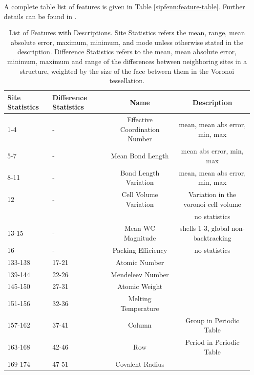 A complete table list of features is given in Table \ref{sipfenn:feature-table}. Further details can be found in \cite{Ward2016AMaterials, Ward2017IncludingTessellations}.

\begin{table}[H]
    \footnotesize
    \centering
    \caption{List of Features with Descriptions. Site Statistics refers the mean, range, mean absolute error, maximum, minimum, and mode unless otherwise stated in the description. Difference Statistics refers to the mean, mean absolute error, minimum, maximum and range of the differences between neighboring sites in a structure, weighted by the size of the face between them in the Voronoi tessellation.}
    \begin{tabular}{|p{2.25cm}|p{2cm}|c|c|}
        \hline
        \textbf{Site \hspace{0.3cm} Statistics} & \textbf{Difference \hspace{0.3cm} Statistics} & \textbf{Name} & \textbf{Description} \\
        \hline
        1-4 & - & Effective Coordination Number & mean, mean abs error, min, max\\
        \hline
        5-7 & - & Mean Bond Length & mean abs error, min, max\\
        \hline
        8-11 & - & Bond Length Variation & mean, mean abs error, min, max \\
        \hline
        12 & - & Cell Volume Variation & Variation in the voronoi cell volume\\
        & & & no statistics \\
        \hline
        13-15 & - & Mean WC Magnitude & shells 1-3, global non-backtracking \\
        \hline
        16 & - & Packing Efficiency & no statistics \\
        \hline
        133-138 & 17-21 & Atomic Number & \\
        \hline
        139-144 & 22-26 & Mendeleev Number & \\ 
        \hline
        145-150 & 27-31 & Atomic Weight & \\ 
        \hline
        151-156 & 32-36 & Melting Temperature & \\ 
        \hline
        157-162 & 37-41 & Column & Group in Periodic Table \\ 
        \hline
        163-168 & 42-46 & Row & Period in Periodic Table\\ 
        \hline
        169-174 & 47-51 & Covalent Radius & \\ 

\end{tabular}
\end{table}
